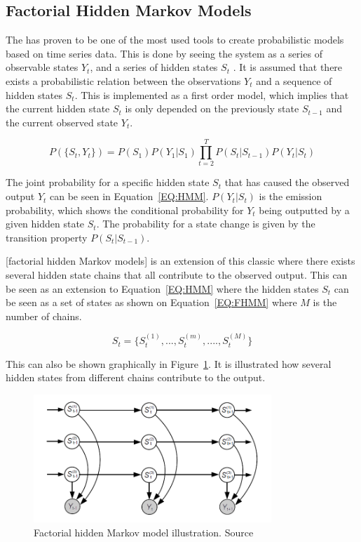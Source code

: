 \subsection{Factorial Hidden Markov Models}
The  has proven to be one of the most used tools to create probabilistic models based on time series data. This is done by seeing the system as a series of observable states $Y_t$, and a series of hidden states $S_t$ \citep{RefWorks:20}. It is assumed that there exists a probabilistic relation between the observations $Y_t$ and a sequence of hidden states $S_t$. This is implemented as a first order model, which implies that the current hidden state $S_t$ is only depended on the previously state $S_{t-1}$ and the current observed state $Y_t$.

\begin{equation}
	P(\{ S_t, Y_t \} ) = P(S_1)P(Y_1 | S_1) \prod_{t=2}^T P(S_t|S_{t-1})P(Y_t|S_t)
	\label{EQ:HMM}
\end{equation}

The joint probability for a specific hidden state $S_t$ that has caused the observed output $Y_t$ can be seen in Equation~\ref{EQ:HMM}. $P(Y_t|S_t)$ is the emission probability, which shows the conditional probability for $Y_t$ being outputted by a given hidden state $S_t$. The probability for a state change is given by the transition property $P(S_t|S_{t-1})$. 

[factorial hidden Markov models] is an extension of this classic  where there exists several hidden state chains that all contribute to the observed output. This can be seen as an extension to Equation~\ref{EQ:HMM} where the hidden states $S_t$ can be seen as a set of states as shown on Equation~\ref{EQ:FHMM} where $M$ is the number of chains.

\begin{equation}
	S_t = \{ S_t^{(1)}, ..., S_t^{(m)}, ...., S_t^{(M)} \}
	\label{EQ:FHMM}
\end{equation}

This can also be shown graphically in Figure~\ref{fig:FHMM}. It is illustrated how several hidden states from different chains contribute to the output. 

\begin{figure}[H]
\centering
\includegraphics[width=0.8\textwidth]{billeder/FHMM.png}
\caption[Factorial hidden Markov model illustration.]{Factorial hidden Markov model illustration. Source \citep{RefWorks:20}}
\label{fig:FHMM}
\end{figure}

